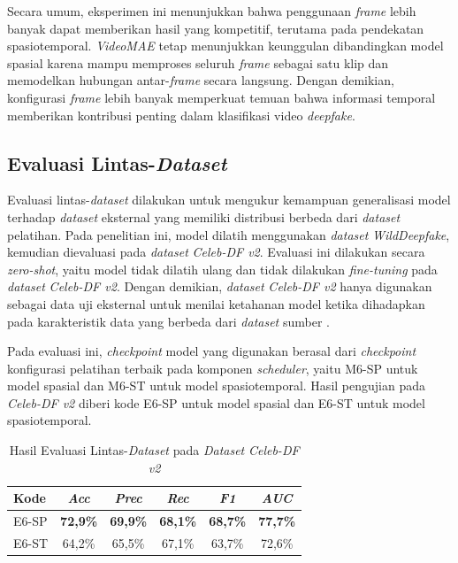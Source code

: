 Secara umum, eksperimen ini menunjukkan bahwa penggunaan \textit{frame} lebih banyak dapat memberikan hasil yang kompetitif, terutama pada pendekatan spasiotemporal. \textit{VideoMAE} tetap menunjukkan keunggulan dibandingkan model spasial karena mampu memproses seluruh \textit{frame} sebagai satu klip dan memodelkan hubungan antar-\textit{frame} secara langsung. Dengan demikian, konfigurasi \textit{frame} lebih banyak memperkuat temuan bahwa informasi temporal memberikan kontribusi penting dalam klasifikasi video \textit{deepfake}.

\subsection{Evaluasi Lintas-\textit{Dataset}} \label{IV.Evaluasi_Lintas_Dataset}

Evaluasi lintas-\textit{dataset} dilakukan untuk mengukur kemampuan generalisasi model terhadap \textit{dataset} eksternal yang memiliki distribusi berbeda dari \textit{dataset} pelatihan. Pada penelitian ini, model dilatih menggunakan \textit{dataset} \textit{WildDeepfake}, kemudian dievaluasi pada \textit{dataset} \textit{Celeb-DF v2}. Evaluasi ini dilakukan secara \textit{zero-shot}, yaitu model tidak dilatih ulang dan tidak dilakukan \textit{fine-tuning} pada \textit{dataset} \textit{Celeb-DF v2}. Dengan demikian, \textit{dataset} \textit{Celeb-DF v2} hanya digunakan sebagai data uji eksternal untuk menilai ketahanan model ketika dihadapkan pada karakteristik data yang berbeda dari \textit{dataset} sumber \cite{Zi2024,li2020celebdflargescalechallengingdataset}.

Pada evaluasi ini, \textit{checkpoint} model yang digunakan berasal dari \textit{checkpoint} konfigurasi pelatihan terbaik pada komponen \textit{scheduler}, yaitu M6-SP untuk model spasial dan M6-ST untuk model spasiotemporal. Hasil pengujian pada \textit{Celeb-DF v2} diberi kode E6-SP untuk model spasial dan E6-ST untuk model spasiotemporal.

\begin{table}[htbp]
\centering
\caption{Hasil Evaluasi Lintas-\textit{Dataset} pada \textit{Dataset} \textit{Celeb-DF v2}}
\label{table:4.cross-dataset}
\begin{tabular}{lccccc}
\toprule
\textbf{Kode} &
\textbf{\textit{Acc}} &
\textbf{\textit{Prec}} &
\textbf{\textit{Rec}} &
\textbf{\textit{F1}} &
\textbf{\textit{AUC}} \\
\midrule
E6-SP & \textbf{72,9\%} & \textbf{69,9\%} & \textbf{68,1\%} & \textbf{68,7\%} & \textbf{77,7\%} \\
E6-ST & 64,2\% & 65,5\% & 67,1\% & 63,7\% & 72,6\% \\
\bottomrule
\end{tabular}
\end{table}

